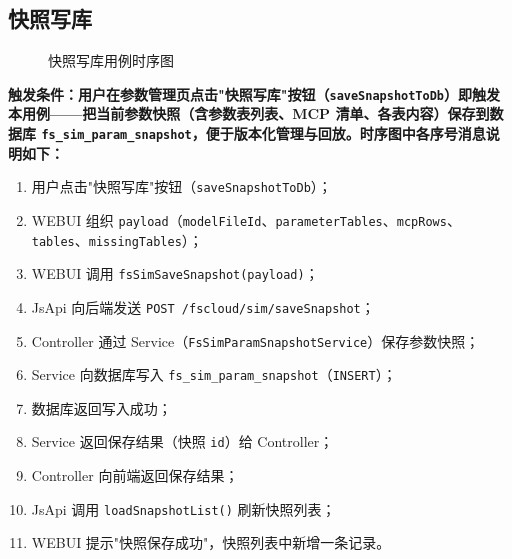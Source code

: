 \subsection{快照写库}
\begin{figure}[!h]
	\centering
	\resizebox{1.0\linewidth}{!}{}
	\caption{快照写库用例时序图}\label{fig:snapshotToDb}
\end{figure}
\bf{触发条件}：用户在参数管理页点击"快照写库"按钮（\texttt{saveSnapshotToDb}）即触发本用例——把当前参数快照（含参数表列表、MCP 清单、各表内容）保存到数据库 \texttt{fs\_sim\_param\_snapshot}，便于版本化管理与回放。时序图中各序号消息说明如下：
\begin{enumerate}[label=\arabic*)]
	\item 用户点击"快照写库"按钮（\texttt{saveSnapshotToDb}）；
	\item WEBUI 组织 \texttt{payload}（\texttt{modelFileId}、\texttt{parameterTables}、\texttt{mcpRows}、\texttt{tables}、\texttt{missingTables}）；
	\item WEBUI 调用 \texttt{fsSimSaveSnapshot(payload)}；
	\item JsApi 向后端发送 \texttt{POST /fscloud/sim/saveSnapshot}；
	\item Controller 通过 Service（\texttt{FsSimParamSnapshotService}）保存参数快照；
	\item Service 向数据库写入 \texttt{fs\_sim\_param\_snapshot}（\texttt{INSERT}）；
	\item 数据库返回写入成功；
	\item Service 返回保存结果（快照 \texttt{id}）给 Controller；
	\item Controller 向前端返回保存结果；
	\item JsApi 调用 \texttt{loadSnapshotList()} 刷新快照列表；
	\item WEBUI 提示"快照保存成功"，快照列表中新增一条记录。
\end{enumerate}
\newpage
